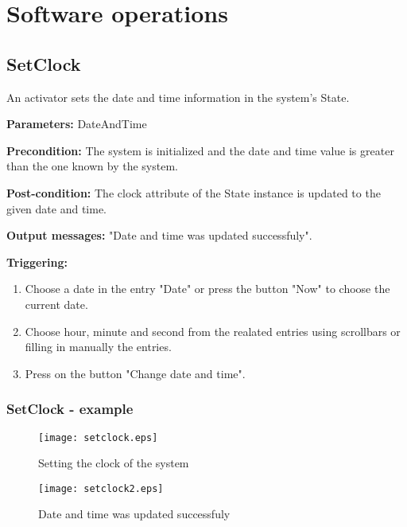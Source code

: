 \chapter{Software operations}
\label{chap:soptware_operations}

\section{SetClock}
\label{operation:CloseCrisis}

An activator sets the date and time information in the system's State.

\begin{description}
	\item \textbf{Parameters:} DateAndTime
	\item \textbf{Precondition:} The system is initialized and the date and time
	value is greater than the one known by the system.
	\item \textbf{Post-condition:} The clock attribute of the State instance is
	updated to the given date and time.
	\item \textbf{Output messages:} "Date and time was updated
	successfuly".
	
	\item \textbf{Triggering:}
	
	\begin{enumerate}
		\item Choose a date in the entry "Date" or press the button "Now" to choose
		the current date.
		\item Choose hour, minute and second from the realated entries using
		scrollbars or filling in manually the entries.
		\item Press on the button "Change date and time".
	\end{enumerate}
\end{description}

\subsection{SetClock - example}

\begin{figure}[h]
    \texttt{[image: setclock.eps]}
	\caption{Setting the clock of the system}
\end{figure}

\begin{figure}[h]
    \texttt{[image: setclock2.eps]}
	\caption{Date and time was updated successfuly}
\end{figure}

